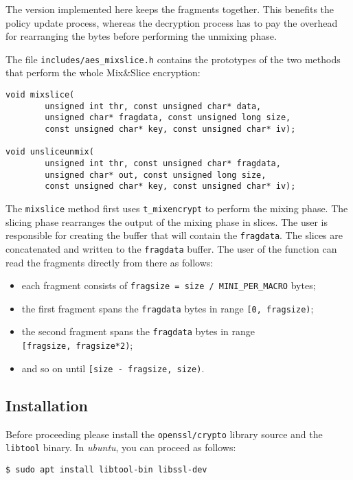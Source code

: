 The version implemented here keeps the fragments together. This benefits
the policy update process, whereas the decryption process has to pay the
overhead for rearranging the bytes before performing the unmixing phase.

The file \texttt{includes/aes\_mixslice.h} contains the prototypes of
the two methods that perform the whole Mix\&Slice encryption:

\begin{verbatim}
void mixslice(
        unsigned int thr, const unsigned char* data,
        unsigned char* fragdata, const unsigned long size,
        const unsigned char* key, const unsigned char* iv);

void unsliceunmix(
        unsigned int thr, const unsigned char* fragdata,
        unsigned char* out, const unsigned long size,
        const unsigned char* key, const unsigned char* iv);
\end{verbatim}

The \texttt{mixslice} method first uses \texttt{t\_mixencrypt} to
perform the mixing phase. The slicing phase rearranges the output of the
mixing phase in slices. The user is responsible for creating the buffer
that will contain the \texttt{fragdata}. The slices are concatenated and
written to the \texttt{fragdata} buffer. The user of the function can
read the fragments directly from there as follows:

\begin{itemize}
\tightlist
\item
  each fragment consists of
  \texttt{fragsize\ =\ size\ /\ MINI\_PER\_MACRO} bytes;
\item
  the first fragment spans the \texttt{fragdata} bytes in range
  \texttt{{[}0,\ fragsize)};
\item
  the second fragment spans the \texttt{fragdata} bytes in range
  \texttt{{[}fragsize,\ fragsize*2)};
\item
  and so on until \texttt{{[}size\ -\ fragsize,\ size)}.
\end{itemize}


\subsection{Installation}

Before proceeding please install the \texttt{openssl/crypto} library
source and the \texttt{libtool} binary. In {\em ubuntu}, you can proceed as
follows:

\begin{verbatim}
$ sudo apt install libtool-bin libssl-dev
\end{verbatim}

